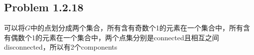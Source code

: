 \subsection*{Problem 1.2.18}
可以将$G$中的点划分成两个集合，所有含有奇数个1的元素在一个集合中，所有含有偶数个1的元素在一个集合中，两个点集分别是connected且相互之间disconnected，所以有2个components

